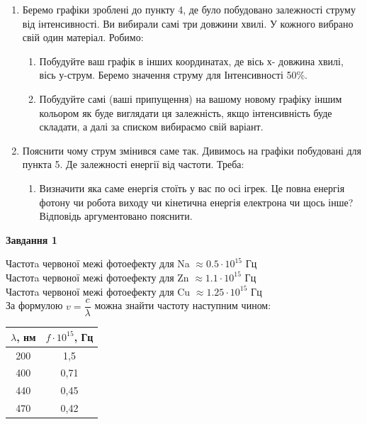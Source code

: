 \documentclass[a4paper,14pt]{extreport}
\begin{document}
\begin{enumerate}
		\item Беремо  графіки зроблені до пункту 4, де було побудовано залежності струму від інтенсивності. Ви вибирали самі три довжини хвилі. У кожного вибрано свій один матеріал. Робимо:
		\begin{enumerate}[label=2.\arabic*]
			\item Побудуйте ваш графік в інших координатах, де вісь х- довжина хвилі, вісь у-струм. Беремо значення струму для Інтенсивності 50\%.
			\item Побудуйте самі (ваші припущення) на вашому новому графіку іншим кольором як буде виглядати ця залежність, якщо інтенсивність буде складати, а далі за списком вибираємо свій варіант.
		\end{enumerate}
		\item Пояснити чому струм змінився саме так. Дивимось на графіки побудовані для пункта 5. Де залежності енергії від частоти. Треба:
		\begin{enumerate}[label=3.\arabic*]
			\item Визначити яка саме енергія стоїть у вас по осі ігрек. Це повна енергія фотону чи робота виходу чи кінетична енергія електрона чи щось інше? Відповідь аргументовано пояснити.
		\end{enumerate}
\end{enumerate}
\newpage
	
\begin{center}
\textbf{Завдання 1}
\end{center}


Частотa червоної межі фотоефекту для Na $\approx  0.5 \cdot 10^{15}$ Гц \\
Частотa червоної межі фотоефекту для Zn $\approx  1.1 \cdot 10^{15}$ Гц \\
Частотa червоної межі фотоефекту для Cu $\approx  1.25 \cdot  10^{15}$ Гц\\ 
	

	За формулою $v = \dfrac{c}{\lambda}$ можна знайти частоту наступним чином:
	
	
	\begin{table}[h]
		\begin{center}
			\begin{tabular}{|c|c|}
			\hline
			$\lambda$, нм & $f \cdot 10^{15}$,  Гц \\ \hline
			200               & 1,5                   \\ \hline
			400               & 0,71                  \\ \hline
			440               & 0,45                 \\ \hline
			470               & 0,42                  \\ \hline
			\end{tabular}
		\end{center}
	\end{table}
	
\end{document}

